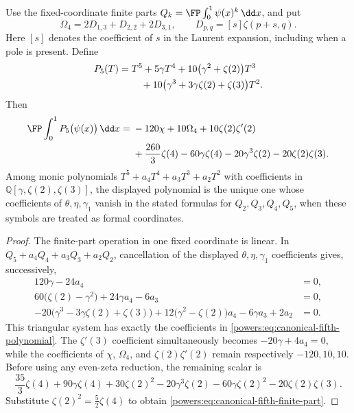 \begin{corollary}
\label{powers:cor:canonical-fifth}
Use the fixed-coordinate finite parts
\(Q_k=\FP\int_0^1\psi(x)^k\,\dd x\), and put
\[
 \Omega_4=2D_{1,3}+D_{2,2}+2D_{3,1},
 \qquad D_{p,q}=[s]\zeta(p+s,q).
\]
Here \([s]\) denotes the coefficient of \(s\) in the Laurent
expansion, including when a pole is present. Define
\begin{align}
 P_5(T)={}&T^5+5\gamma T^4
      +10\bigl(\gamma^2+\zeta(2)\bigr)T^3\notag\\
 &\quad+10\bigl(\gamma^3+3\gamma\zeta(2)+\zeta(3)\bigr)T^2.
 \label{powers:eq:canonical-fifth-polynomial}
\end{align}
Then
\begin{align}
 \FP\int_0^1P_5\bigl(\psi(x)\bigr)\,\dd x
 ={}&-120\chi+10\Omega_4+10\zeta(2)\zeta'(2)\notag\\
 &+\frac{260}{3}\zeta(4)-60\gamma\zeta(4)
      -20\gamma^3\zeta(2)-20\zeta(2)\zeta(3).
 \label{powers:eq:canonical-fifth-finite-part}
\end{align}
Among monic polynomials
\(T^5+a_4T^4+a_3T^3+a_2T^2\) with coefficients in
\(\mathbb Q[\gamma,\zeta(2),\zeta(3)]\), the displayed polynomial is
the unique one whose coefficients of \(\theta,\eta,\gamma_1\)
vanish in the stated formulas for \(Q_2,Q_3,Q_4,Q_5\), when these
symbols are treated as formal coordinates.
\end{corollary}

\begin{proof}
The finite-part operation in one fixed coordinate is linear. In
\(Q_5+a_4Q_4+a_3Q_3+a_2Q_2\), cancellation of the displayed
\(\theta,\eta,\gamma_1\) coefficients gives, successively,
\begin{align*}
 120\gamma-24a_4&=0,\\
 60\bigl(\zeta(2)-\gamma^2\bigr)+24\gamma a_4-6a_3&=0,\\
 -20\bigl(\gamma^3-3\gamma\zeta(2)+\zeta(3)\bigr)
 +12\bigl(\gamma^2-\zeta(2)\bigr)a_4-6\gamma a_3+2a_2&=0.
\end{align*}
This triangular system has exactly the coefficients in
\eqref{powers:eq:canonical-fifth-polynomial}. The
\(\zeta'(3)\) coefficient simultaneously becomes
\(-20\gamma+4a_4=0\), while the coefficients of \(\chi\),
\(\Omega_4\), and \(\zeta(2)\zeta'(2)\) remain respectively
\(-120,10,10\). Before using any even-zeta reduction, the remaining
scalar is
\[
 \frac{35}{3}\zeta(4)+90\gamma\zeta(4)+30\zeta(2)^2
 -20\gamma^3\zeta(2)-60\gamma\zeta(2)^2
 -20\zeta(2)\zeta(3).
\]
Substitute \(\zeta(2)^2=\tfrac52\zeta(4)\) to obtain
\eqref{powers:eq:canonical-fifth-finite-part}.
\end{proof}

